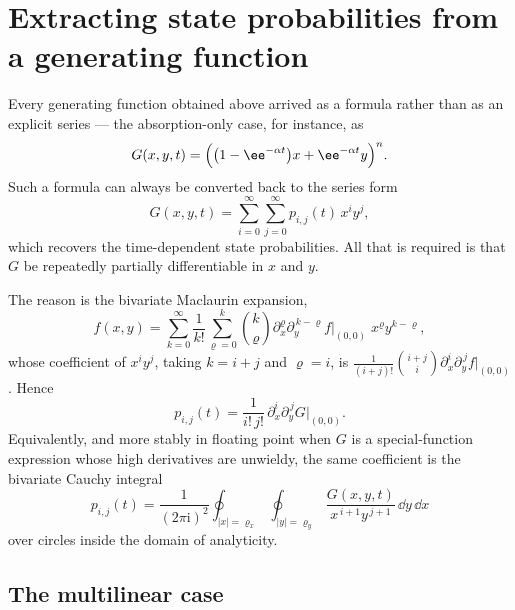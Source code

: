 \section{Extracting state probabilities from a generating function}
\label{m:app:extract}

Every generating function obtained above arrived as a formula rather than as an
explicit series --- the absorption-only case, for instance, as
\begin{equation}
\label{m:eq:examplePgf}
G(x,y,t) = \Bigl(\bigl(1-\ee^{-\alpha t}\bigr)x + \ee^{-\alpha t}y\Bigr)^n .
\end{equation}
Such a formula can always be converted back to the series form
\begin{equation}
\label{m:eq:series1}
G(x,y,t) = \sum_{i=0}^{\infty}\sum_{j=0}^{\infty}p_{i,j}(t)\,x^iy^j ,
\end{equation}
which recovers the time-dependent state probabilities. All that is required is that
$G$ be repeatedly partially differentiable in $x$ and $y$.

The reason is the bivariate Maclaurin expansion,
\begin{equation*}
f(x,y) = \sum_{k=0}^{\infty}\frac{1}{k!}\sum_{\varrho=0}^{k}\binom{k}{\varrho}
\partial_x^{\varrho}\partial_y^{\,k-\varrho}f\Big|_{(0,0)}\;x^{\varrho}y^{k-\varrho},
\end{equation*}
whose coefficient of $x^iy^j$, taking $k=i+j$ and $\varrho=i$, is
$\frac{1}{(i+j)!}\binom{i+j}{i}\partial_x^i\partial_y^{\,j}f\big|_{(0,0)}$. Hence
\begin{equation}
\label{m:eq:stateProb}
p_{i,j}(t) = \frac{1}{i!\,j!}\,\partial_x^i\partial_y^{\,j}G\Big|_{(0,0)} .
\end{equation}
Equivalently, and more stably in floating point when $G$ is a special-function
expression whose high derivatives are unwieldy, the same coefficient is the
bivariate Cauchy integral
\begin{equation}
\label{m:eq:bivariateCauchy}
p_{i,j}(t) = \frac{1}{(2\pi\mathrm i)^2}
\oint_{|x|=\varrho_x}\oint_{|y|=\varrho_y}
\frac{G(x,y,t)}{x^{\,i+1}y^{\,j+1}}\,\dd y\,\dd x
\end{equation}
over circles inside the domain of analyticity.

\subsection*{The multilinear case}

